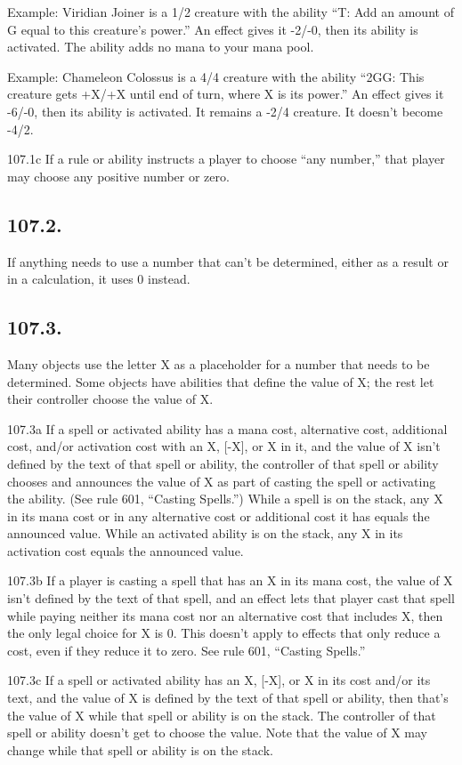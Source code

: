 Example: Viridian Joiner is a 1/2 creature with the ability “{T}: Add an amount of {G} equal to this creature’s power.” An effect gives it -2/-0, then its ability is activated. The ability adds no mana to your mana pool.

Example: Chameleon Colossus is a 4/4 creature with the ability “{2}{G}{G}: This creature gets +X/+X until end of turn, where X is its power.” An effect gives it -6/-0, then its ability is activated. It remains a -2/4 creature. It doesn’t become -4/2.

107.1c If a rule or ability instructs a player to choose “any number,” that player may choose any positive number or zero.

\subsection*{107.2.}
If anything needs to use a number that can’t be determined, either as a result or in a calculation, it uses 0 instead.

\subsection*{107.3.}
Many objects use the letter X as a placeholder for a number that needs to be determined. Some objects have abilities that define the value of X; the rest let their controller choose the value of X.

107.3a If a spell or activated ability has a mana cost, alternative cost, additional cost, and/or activation cost with an {X}, [-X], or X in it, and the value of X isn’t defined by the text of that spell or ability, the controller of that spell or ability chooses and announces the value of X as part of casting the spell or activating the ability. (See rule 601, “Casting Spells.”) While a spell is on the stack, any X in its mana cost or in any alternative cost or additional cost it has equals the announced value. While an activated ability is on the stack, any X in its activation cost equals the announced value.

107.3b If a player is casting a spell that has an {X} in its mana cost, the value of X isn’t defined by the text of that spell, and an effect lets that player cast that spell while paying neither its mana cost nor an alternative cost that includes X, then the only legal choice for X is 0. This doesn’t apply to effects that only reduce a cost, even if they reduce it to zero. See rule 601, “Casting Spells.”

107.3c If a spell or activated ability has an {X}, [-X], or X in its cost and/or its text, and the value of X is defined by the text of that spell or ability, then that’s the value of X while that spell or ability is on the stack. The controller of that spell or ability doesn’t get to choose the value. Note that the value of X may change while that spell or ability is on the stack.

